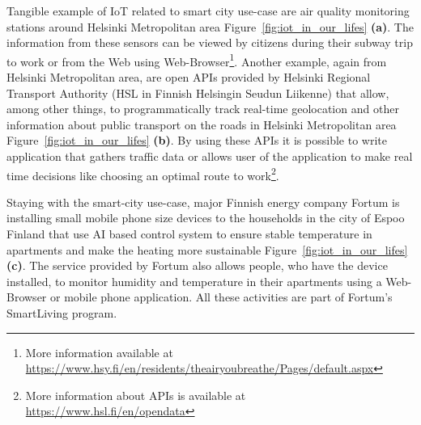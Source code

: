 \documentclass[english, 12pt, a4paper, elec, utf8, online]{aaltothesis}
\begin{document}
Tangible example of IoT related to smart city use-case are air quality monitoring stations around Helsinki Metropolitan area Figure~\ref{fig:iot_in_our_lifes} \textbf{(a)}. The information from these sensors can be viewed by citizens during their subway trip to work or from the Web using Web-Browser\footnote{More information available at \url{https://www.hsy.fi/en/residents/theairyoubreathe/Pages/default.aspx}}. Another example, again from Helsinki Metropolitan area, are open APIs provided by Helsinki Regional Transport Authority (HSL in Finnish Helsingin Seudun Liikenne) that allow, among other things, to programmatically track real-time geolocation and other information about public transport on the roads in Helsinki Metropolitan area Figure~\ref{fig:iot_in_our_lifes} \textbf{(b)}. By using these APIs it is possible to write application that gathers traffic data or allows user of the application to make real time decisions like choosing an optimal route to work\footnote{More information about APIs is available at \url{https://www.hsl.fi/en/opendata}}.  

Staying with the smart-city use-case, major Finnish energy company Fortum is installing small mobile phone size devices to the households in the city of Espoo Finland that use AI based control system to ensure stable temperature in apartments and make the heating more sustainable Figure~\ref{fig:iot_in_our_lifes} \textbf{(c)}. The service provided by Fortum also allows people, who have the device installed, to monitor humidity and temperature in their apartments using a Web-Browser or mobile phone application. All these activities are part of Fortum's SmartLiving program.   
\end{document}

